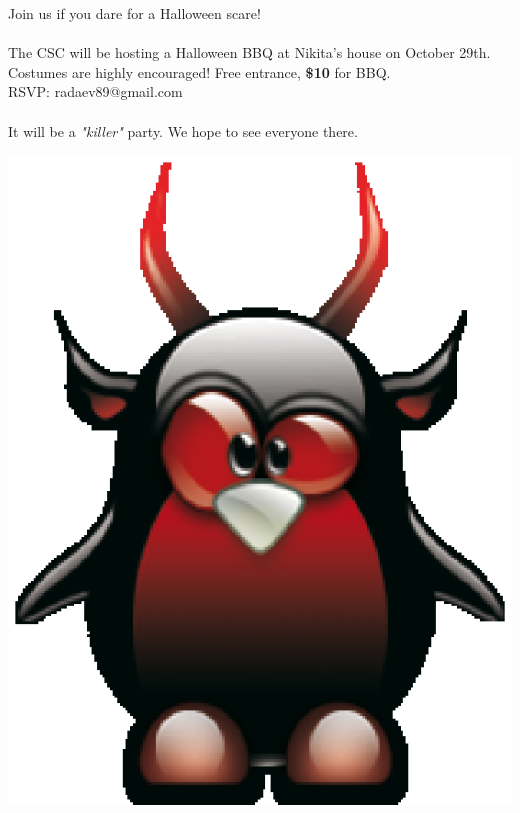 \documentclass{article}
\begin{document}


Join us if you dare for a Halloween scare!\\ \\
The CSC will be hosting a Halloween BBQ at Nikita's house on October 29th.\\
Costumes are highly encouraged! Free entrance, \textbf{\$10} for BBQ.\\

RSVP: radaev89@gmail.com\\
\\
It will be a \emph{"killer"} party. We hope to see everyone there.\\


\begin{center}
\includegraphics[scale=0.5]{evil-tux.eps}
\end{center}
\end{document}
